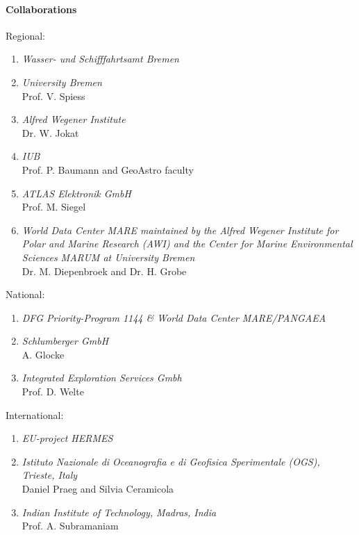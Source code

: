 \paragraph{Collaborations}
\noindent

Regional:
\begin{enumerate}
\item {\sl Wasser- und Schifffahrtsamt Bremen}
\item {\sl University Bremen} \\ Prof. V. Spiess
\item {\sl Alfred Wegener Institute} \\ Dr. W. Jokat
\item {\sl IUB} \\ Prof. P. Baumann and GeoAstro faculty
\item {\sl ATLAS Elektronik GmbH } \\ Prof. M. Siegel
\item {\sl World Data Center MARE maintained by the Alfred Wegener
Institute for Polar and Marine Research (AWI) and the Center for
Marine Environmental Sciences MARUM at University Bremen} \\
Dr. M. Diepenbroek and Dr. H. Grobe
\end{enumerate}

National:
\begin{enumerate}
\item {\sl DFG Priority-Program 1144 \& World Data Center
MARE/PANGAEA}
\item {\sl Schlumberger GmbH} \\ A. Glocke
\item {\sl Integrated Exploration Services Gmbh} \\ Prof. D. Welte
\end{enumerate}

International:
\begin{enumerate}
\item {\sl EU-project HERMES}
\item {\sl Istituto Nazionale di Oceanografia e di Geofisica Sperimentale (OGS), Trieste, Italy} \\ Daniel Praeg and Silvia Ceramicola
\item {\sl Indian Institute of Technology, Madras, India} \\ Prof. A. Subramaniam
\end{enumerate}

